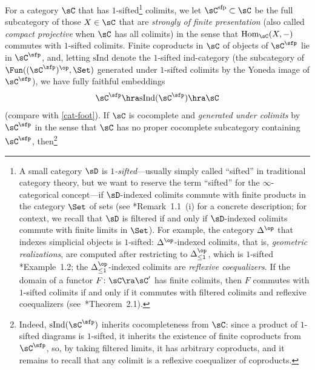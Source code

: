 For a category $\sC$ that has $1$-sifted\footnote{\label{foot-sifted}A small category $\sD$ is \emph{$1$-sifted}---usually simply called ``sifted'' in traditional category theory, but we want to reserve the term ``sifted'' for the $\infty$-categorical concept---if $\sD$-indexed colimits commute with finite products in the category $\Set$ of sets (see \cite{ARV10}*{Remark~1.1~(i)} for a concrete description; for context, we recall that $\sD$ is filtered if and only if $\sD$-indexed colimits commute with finite limits in $\Set$). %
For example, the category $\Delta^\op$ that indexes simplicial objects is $1$-sifted: $\Delta^\op$-indexed colimits, that is, \emph{geometric realizations}, are computed after restricting to $\Delta^\op_{\le 1}$, %
which is $1$-sifted \cite{ARV10}*{Example~1.2}; the $\Delta^\op_{\le 1}$-indexed colimits are \emph{reflexive coequalizers}. If the domain of a functor $F \colon \sC \ra \sC'$  has finite colimits, then $F$ commutes with $1$-sifted colimits if and only if it commutes with filtered colimits and reflexive coequalizers (see~\cite{ARV10}*{Theorem~2.1}).
} colimits, %
we let $\sC^{\mathrm{sfp}} \subset \sC$ be the full subcategory of those $X \in \sC$ that are \emph{strongly of finite presentation} (also called \emph{compact projective} when $\sC$ has all colimits) in the sense that $\Hom_{\sC}(X, -)$ commutes with $1$-sifted colimits. Finite coproducts in $\sC$ of objects of $\sC^\sfp$ lie in $\sC^\sfp$, and, letting $\mathrm{sInd}$ denote the $1$-sifted ind-category (the subcategory of $\Fun((\sC^\sfp)^\op,\Set)$ generated under $1$-sifted colimits by the Yoneda image of $\sC^\sfp$), we have fully faithful embeddings %
\[
\sC^\sfp \hra \mathrm{sInd}(\sC^\sfp) \hra \sC %
\]
(compare with \cref{cat-foot}).
If $\sC$ is cocomplete and \emph{generated under colimits} by $\sC^\sfp$ in the sense that $\sC$ has no proper cocomplete subcategory containing $\sC^\sfp$, then\footnote{\label{sInd-coco}Indeed, $\mathrm{sInd}(\sC^\sfp)$ inherits cocompleteness from $\sC$: since a product of $1$-sifted diagrams is $1$-sifted, %
it inherits the existence of finite coproducts from $\sC^\sfp$, so, by taking filtered limits, it has arbitrary coproducts, and it remains to recall that any colimit is a reflexive coequalizer of coproducts.}
